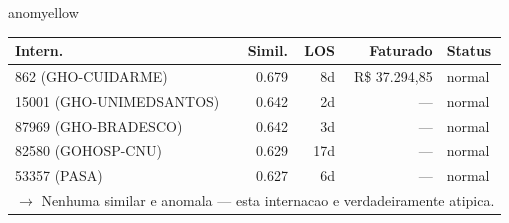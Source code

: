 \documentclass[a4paper,10pt]{article}
\begin{document}
\begin{anomalycard}[Internacao 405 | GHO-UNIMEDVITORIA2 | MODERADO (z=2.04)]{anomyellow}
\begin{tabular}{l r r r l}\toprule\textbf{Intern.} & \textbf{Simil.} & \textbf{LOS} & \textbf{Faturado} & \textbf{Status} \\\midrule
862 (GHO-CUIDARME) & 0.679 & 8d & R\$ 37.294,85 & \textcolor{jcubeblue}{normal} \\
15001 (GHO-UNIMEDSANTOS) & 0.642 & 2d & --- & \textcolor{jcubeblue}{normal} \\
87969 (GHO-BRADESCO) & 0.642 & 3d & --- & \textcolor{jcubeblue}{normal} \\
82580 (GOHOSP-CNU) & 0.629 & 17d & --- & \textcolor{jcubeblue}{normal} \\
53357 (PASA) & 0.627 & 6d & --- & \textcolor{jcubeblue}{normal} \\
\multicolumn{5}{l}{\textcolor{jcubeblue}{\small $\rightarrow$ Nenhuma similar e anomala --- esta internacao e verdadeiramente atipica.}} \\
\bottomrule\end{tabular}


\end{anomalycard}

\newpage
\end{document}
